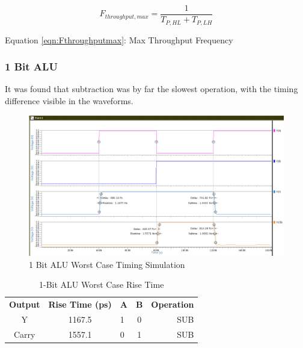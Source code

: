 \documentclass[11pt]{article}
\begin{document}
		\begin{equation}\label{eqn:Fthroughputmax}
		F_{throughput,max} = \frac{1}{T_{P,HL}+T_{P,LH}}
		\end{equation}
		\begin{center}
			Equation \ref{eqn:Fthroughputmax}: Max Throughput Frequency
		\end{center}
	
		\subsubsection{1 Bit ALU}
			It was found that subtraction was by far the slowest operation, with the timing difference visible in the waveforms.  
		
			\begin{figure}[H]
				\centering
				\includegraphics[width=1\linewidth]{"Pictures/ALU_1Bit Timing"}
				\caption{1 Bit ALU Worst Case Timing Simulation}
				\label{fig:alu1bit-timing}
			\end{figure}
			
			\begin{table}[H]
				\centering
				\caption{1-Bit ALU Worst Case Rise Time}
				\label{tab:ALU-1-Bit-Risetime}
				\begin{tabular}{|cclcr|}
					\hline
					\textbf{Output} & \textbf{Rise Time (ps)} & \textbf{A} & \textbf{B} & \textbf{Operation} \\
					Y               & 1167.5                  & 1          & 0          & SUB                \\
					Carry           & 1557.1                  & 0          & 1          & SUB                \\
					         \hline
				\end{tabular}
			\end{table}
		
\end{document}
